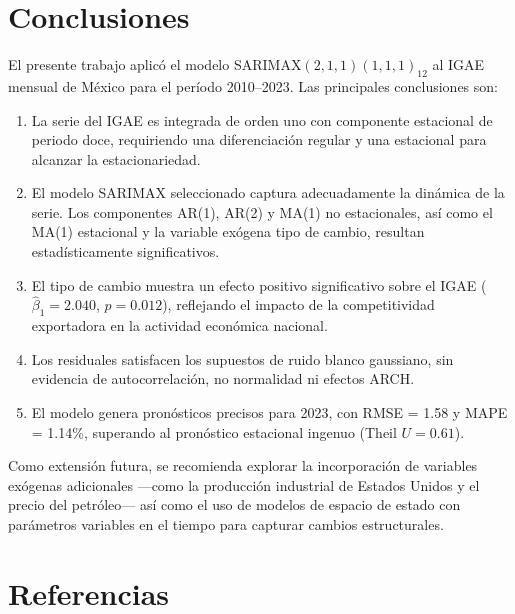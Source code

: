 \documentclass[12pt,a4paper]{article}
\begin{document}
\section{Conclusiones}

El presente trabajo aplicó el modelo SARIMAX$(2,1,1)(1,1,1)_{12}$ al IGAE mensual de México para el período 2010--2023. Las principales conclusiones son:

\begin{enumerate}[label=\arabic*.]
  \item La serie del IGAE es integrada de orden uno con componente estacional de periodo doce, requiriendo una diferenciación regular y una estacional para alcanzar la estacionariedad.

  \item El modelo SARIMAX seleccionado captura adecuadamente la dinámica de la serie. Los componentes AR(1), AR(2) y MA(1) no estacionales, así como el MA(1) estacional y la variable exógena tipo de cambio, resultan estadísticamente significativos.

  \item El tipo de cambio muestra un efecto positivo significativo sobre el IGAE ($\hat{\beta}_1 = 2.040$, $p=0.012$), reflejando el impacto de la competitividad exportadora en la actividad económica nacional.

  \item Los residuales satisfacen los supuestos de ruido blanco gaussiano, sin evidencia de autocorrelación, no normalidad ni efectos ARCH.

  \item El modelo genera pronósticos precisos para 2023, con RMSE = 1.58 y MAPE = 1.14\%, superando al pronóstico estacional ingenuo (Theil $U = 0.61$).
\end{enumerate}

Como extensión futura, se recomienda explorar la incorporación de variables exógenas adicionales —como la producción industrial de Estados Unidos y el precio del petróleo— así como el uso de modelos de espacio de estado con parámetros variables en el tiempo para capturar cambios estructurales.

\newpage
\section*{Referencias}
\end{document}
